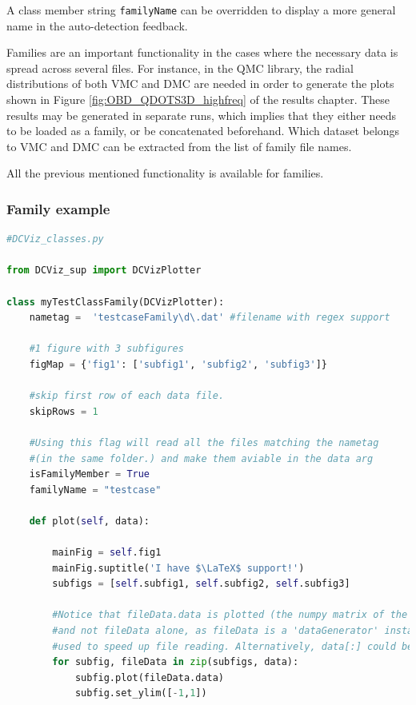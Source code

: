 A class member string \verb+familyName+ can be overridden to display a more general name in the auto-detection feedback. 

Families are an important functionality in the cases where the necessary data is spread across several files. For instance, in the QMC library, the radial distributions of both VMC and DMC are needed in order to generate the plots shown in Figure \ref{fig:OBD_QDOTS3D_highfreq} of the results chapter. These results may be generated in separate runs, which implies that they either needs to be loaded as a family, or be concatenated beforehand. Which dataset belongs to VMC and DMC can be extracted from the list of family file names.

All the previous mentioned functionality is available for families.


\subsubsection{Family example}

\vspace{0.5cm}
\begin{lstlisting}[language=Python, otherkeywords={self}]
#DCViz_classes.py

from DCViz_sup import DCVizPlotter

class myTestClassFamily(DCVizPlotter):
    nametag =  'testcaseFamily\d\.dat' #filename with regex support
    
    #1 figure with 3 subfigures
    figMap = {'fig1': ['subfig1', 'subfig2', 'subfig3']}
    
    #skip first row of each data file.
    skipRows = 1    

    #Using this flag will read all the files matching the nametag
    #(in the same folder.) and make them aviable in the data arg    
    isFamilyMember = True
    familyName = "testcase"
    
    def plot(self, data):
        
        mainFig = self.fig1
        mainFig.suptitle('I have $\LaTeX$ support!')        
        subfigs = [self.subfig1, self.subfig2, self.subfig3]
    
        #Notice that fileData.data is plotted (the numpy matrix of the columns) 
        #and not fileData alone, as fileData is a 'dataGenerator' instance 
        #used to speed up file reading. Alternatively, data[:] could be sent
        for subfig, fileData in zip(subfigs, data):
            subfig.plot(fileData.data)
            subfig.set_ylim([-1,1])
\end{lstlisting}

